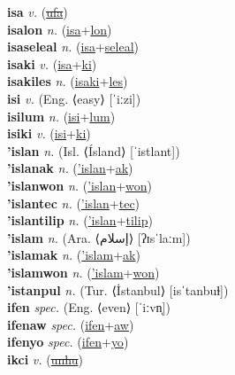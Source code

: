 \textbf{isa} \textit{v.} (\hyperref[ufa]{\sout{ufa}})
 \label{isa} \\
\textbf{isalon} \textit{n.} (\hyperref[isa]{isa}+\hyperref[lon]{lon})
 \label{isalon} \\
\textbf{isaseleal} \textit{n.} (\hyperref[isa]{isa}+\hyperref[seleal]{seleal})
 \label{isaseleal} \\
\textbf{isaki} \textit{v.} (\hyperref[isa]{isa}+\hyperref[ki]{ki})
 \label{isaki} \\
\textbf{isakiles} \textit{n.} (\hyperref[isaki]{isaki}+\hyperref[les]{les})
 \label{isakiles} \\
\textbf{isi} \textit{v.} (Eng. ⟨easy⟩ [ˈiːzi])
 \label{isi} \\
\textbf{isilum} \textit{n.} (\hyperref[isi]{isi}+\hyperref[lum]{lum})
 \label{isilum} \\
\textbf{isiki} \textit{v.} (\hyperref[isi]{isi}+\hyperref[ki]{ki})
 \label{isiki} \\
\textbf{'islan} \textit{n.} (Isl. ⟨Ísland⟩ [ˈistlant])
 \label{'islan} \\
\textbf{'islanak} \textit{n.} (\hyperref['islan]{'islan}+\hyperref[ak]{ak})
 \label{'islanak} \\
\textbf{'islanwon} \textit{n.} (\hyperref['islan]{'islan}+\hyperref[won]{won})
 \label{'islanwon} \\
\textbf{'islantec} \textit{n.} (\hyperref['islan]{'islan}+\hyperref[tec]{tec})
 \label{'islantec} \\
\textbf{'islantilip} \textit{n.} (\hyperref['islan]{'islan}+\hyperref[tilip]{tilip})
 \label{'islantilip} \\
\textbf{'islam} \textit{n.} (Ara. ⟨إسلام⟩ [ʔɪsˈlaːm])
 \label{'islam} \\
\textbf{'islamak} \textit{n.} (\hyperref['islam]{'islam}+\hyperref[ak]{ak})
 \label{'islamak} \\
\textbf{'islamwon} \textit{n.} (\hyperref['islam]{'islam}+\hyperref[won]{won})
 \label{'islamwon} \\
\textbf{'istanpul} \textit{n.} (Tur. ⟨İstanbul⟩ [isˈtanbuɫ])
 \label{'istanpul} \\
\textbf{ifen} \textit{spec.} (Eng. ⟨even⟩ [ˈiːvn̩])
 \label{ifen} \\
\textbf{ifenaw} \textit{spec.} (\hyperref[ifen]{ifen}+\hyperref[aw]{aw})
 \label{ifenaw} \\
\textbf{ifenyo} \textit{spec.} (\hyperref[ifen]{ifen}+\hyperref[yo]{yo})
 \label{ifenyo} \\
\textbf{ikci} \textit{v.} (\hyperref[unhu]{\sout{unhu}})
